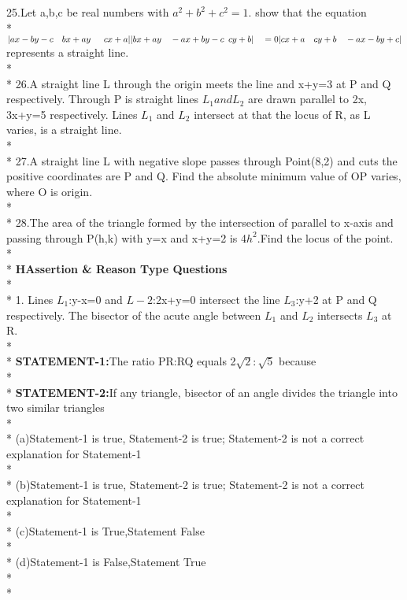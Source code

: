 \documentclass{article}
\begin{document}
{25.\enspace Let a,b,c be real numbers with $a^2+b^2+c^2=1$. show that the equation\\* $\vert
ax-by-c\enspace\enspace bx+ay \enspace\enspace\enspace cx+a \vert\\* 
\vert bx+ay\enspace\enspace -ax+by-c\enspace cy+b\vert\enspace\enspace=0\\* 
\vert cx+a\enspace\enspace cy+b\enspace\enspace -ax-by+c\vert\\*$ represents a straight line.\\*\\*
26.\enspace A straight line L through the origin meets the line and x+y=3 at P and Q respectively. Through P is straight lines $L_1 and L_2$ are drawn parallel to 2x, 3x+y=5 respectively. Lines $L_1$ and $L_2$ intersect at that the locus of R, as L varies, is a straight line.\\*\\*
27.\enspace A straight line L with negative slope passes through Point(8,2) and cuts the positive coordinates are P and Q. Find the absolute minimum value of OP varies, where O is origin.\\*\\*
28.\enspace The area of the triangle formed by the intersection of parallel to x-axis and passing through P(h,k) with y=x and x+y=2 is 4$h^2$.Find the locus of the point.\\*\\*
}
{\Large \textbf{H\enspace Assertion & Reason Type Questions}}\\*\\*
{\large 1. Lines $L_1$:y-x=0 and $L-2$:2x+y=0 intersect the line $L_3$:y+2 at P and Q respectively. The bisector of the acute angle between $L_1$ and $L_2$ intersects $L_3$ at R.}\\*\\*
{\large\textbf{STATEMENT-1:}}{\large The ratio PR:RQ equals 2$\sqrt2:\sqrt5$ because}\\*\\*
{\large\textbf{STATEMENT-2:}}{\large If any triangle, bisector of an angle divides the triangle into two similar triangles}\\*\\*
{\large (a)\enspace Statement-1 is true, Statement-2 is true; Statement-2 is not a correct explanation for Statement-1\\*\\*
(b)\enspace Statement-1 is true, Statement-2 is true; Statement-2 is not a correct explanation for Statement-1\\*\\*
(c)\enspace Statement-1 is True,Statement False\\*\\*
(d)\enspace Statement-1 is False,Statement True\\*\\*}
\end{document}
